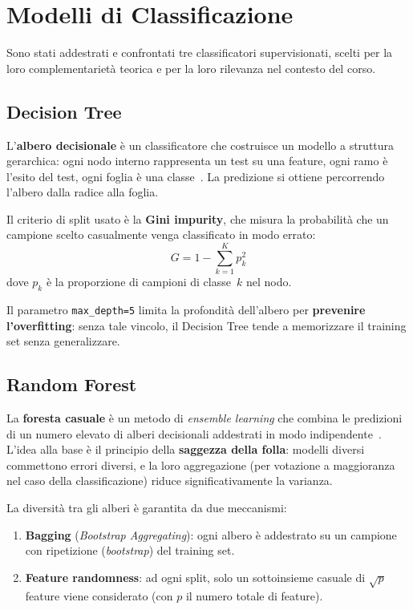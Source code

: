 \documentclass[12pt, a4paper]{article}
\begin{document}
\section{Modelli di Classificazione}

Sono stati addestrati e confrontati tre classificatori supervisionati,
scelti per la loro complementarietà teorica e per la loro rilevanza nel
contesto del corso.

\subsection{Decision Tree}

L'\textbf{albero decisionale} è un classificatore che costruisce un modello
a struttura gerarchica: ogni nodo interno rappresenta un test su una feature,
ogni ramo è l'esito del test, ogni foglia è una classe~\cite{breiman1984}.
La predizione si ottiene percorrendo l'albero dalla radice alla foglia.

Il criterio di split usato è la \textbf{Gini impurity}, che misura la probabilità
che un campione scelto casualmente venga classificato in modo errato:
\begin{equation}
  G = 1 - \sum_{k=1}^{K} p_k^2
\end{equation}
dove $p_k$ è la proporzione di campioni di classe~$k$ nel nodo.

Il parametro \texttt{max\_depth=5} limita la profondità dell'albero per
\textbf{prevenire l'overfitting}: senza tale vincolo, il Decision Tree tende
a memorizzare il training set senza generalizzare.

\subsection{Random Forest}

La \textbf{foresta casuale} è un metodo di \textit{ensemble learning} che
combina le predizioni di un numero elevato di alberi decisionali addestrati in
modo indipendente~\cite{breiman2001}. L'idea alla base è il principio
della \textbf{saggezza della folla}: modelli diversi commettono errori diversi,
e la loro aggregazione (per votazione a maggioranza nel caso della
classificazione) riduce significativamente la varianza.

La diversità tra gli alberi è garantita da due meccanismi:
\begin{enumerate}
  \item \textbf{Bagging} (\textit{Bootstrap Aggregating}): ogni albero è
        addestrato su un campione con ripetizione (\textit{bootstrap}) del
        training set.
  \item \textbf{Feature randomness}: ad ogni split, solo un sottoinsieme
        casuale di $\sqrt{p}$ feature viene considerato (con $p$ il numero
        totale di feature).
\end{enumerate}
\end{document}
